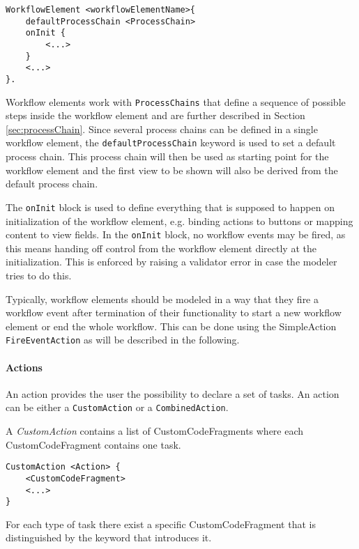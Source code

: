 \begin{lstlisting}
WorkflowElement <workflowElementName>{
	defaultProcessChain <ProcessChain>
	onInit {
		<...>
	}
	<...>
}.
\end{lstlisting}

Workflow elements work with \lstinline!ProcessChains! that define a sequence of possible steps inside the workflow element and are further described in Section \ref{sec:processChain}. Since several process chains can be defined in a single workflow element, the \lstinline!defaultProcessChain! keyword is used to set a default process chain. This process chain will then be used as starting point for the workflow element and the first view to be shown will also be derived from the default process chain.

The \lstinline!onInit! block is used to define everything that is supposed to happen on initialization of the workflow element, e.g. binding actions to buttons or mapping content to view fields. In the \lstinline!onInit! block, no workflow events may be fired, as this means handing off control from the workflow element directly at the initialization. This is enforced by raising a validator error in case the modeler tries to do this.

Typically, workflow elements should be modeled in a way that they fire a workflow event after termination of their functionality to start a new workflow element or end the whole workflow. This can be done using the SimpleAction \lstinline!FireEventAction! as will be described in the following.

\paragraph{Actions}
An action provides the user the possibility to declare a set of tasks. An action can be either a \lstinline!CustomAction! or a \lstinline!CombinedAction!.

A \textit{CustomAction} contains a list of CustomCodeFragments where each CustomCodeFragment contains one task.

\begin{lstlisting}
CustomAction <Action> {
	<CustomCodeFragment>
	<...>
}
\end{lstlisting}

For each type of task there exist a specific CustomCodeFragment that is distinguished by the keyword that introduces it.

